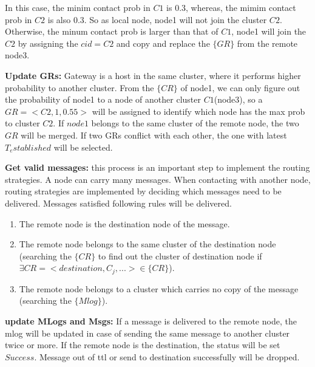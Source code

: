 In this case, the minim contact prob in $C1$ is 0.3, whereas, the mimim contact prob in $C2$ is also 0.3. So as local node, node1 will not join the cluster $C2$. Otherwise, the minum contact prob is larger than that of $C1$, node1 will join the $C2$ by assigning the $cid=C2$ and copy and replace the $\{GR\}$ from the remote node3.

\textbf{Update GRs:} Gateway is a host in the same cluster, where it performs higher probability to another cluster. From the $\{CR\}$ of node1, we can only figure out the probability of node1 to a node of another cluster $C1$(node3), so a $GR=<C2,1,0.55>$ will be assigned to identify which node has the max prob to cluster $C2$. If $node1$ belongs to the same cluster of the remote node, the two $GR$ will be merged. If two GRs conflict with each other, the one with latest $T_established$ will be selected.

\textbf{Get valid messages:} this process is an important step to implement the routing strategies. A node can carry many messages. When contacting with another node, routing strategies are implemented by deciding which messages need to be delivered. Messages satisfied following rules will be delivered.
\begin{enumerate}
  \item The remote node is the destination node of the message.
  \item The remote node belongs to the same cluster of the destination node (searching the $\{CR\}$ to find out the cluster of destination node if $\exists CR=<destination,C_j,...>\in\{CR\}$).
  \item The remote node belongs to a cluster which carries no copy of the message (searching the $\{Mlog\}$).
\end{enumerate}

\textbf{update MLogs and Msgs:} If a message is delivered to the remote node, the mlog will be updated in case of sending the same message to another cluster twice or more. If the remote node is the destination, the status will be set $Success$. Message out of ttl or send to destination successfully will be dropped.
